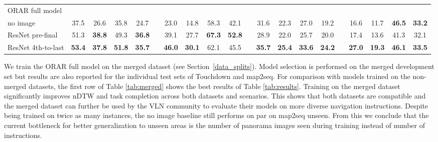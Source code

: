 \documentclass[11pt]{article}
\begin{document}
\begin{table*}[ht]
{\begin{tabular}{@{}lc@{}cc@{}clc@{}cc@{}clc@{}cc@{}clc@{}cc@{}c@{}}
\midrule
ORAR full model\\
 no image          & 37.5 & 26.6 & 35.8 & 24.7 && 23.0 & 14.8 & 58.3 & 42.1 && 31.6 & 22.3 & 27.0 & 19.2 && 16.6 & 11.7 & \textbf{46.5} & \textbf{33.2} \\
 ResNet pre-final  & 51.3 & \textbf{38.8} & 49.3 & \textbf{36.8} && 39.1 & 27.7 & \textbf{67.3} & \textbf{52.8} && 28.9 & 22.0 & 25.7 & 20.0 && 17.4 & 13.6 & 41.3 & 32.1 \\
 ResNet 4th-to-last  & \textbf{53.4} & \textbf{37.8} & \textbf{51.8} & \textbf{35.7} && \textbf{46.0} & \textbf{30.1} & 62.1 & 45.5 && \textbf{35.7} & \textbf{25.4} & \textbf{33.6} & \textbf{24.2} && \textbf{27.0} & \textbf{19.3} & \textbf{46.1} & \textbf{33.5} \\
\bottomrule
\end{tabular}
}
\caption{Results for models trained on the merged dataset. Test results are presented for the merged test set and individual Touchdown and map2seq test sets. Metrics are normalized Dynamic Time Warping~(nDTW) and task completion~(TC). In the first row the best results of Table \ref{tab:results} (non-merged training sets) are listed for comparison. The bottom section presents results on the \textit{ORAR full model} with different types of image features.}
\label{tab:merged}
\end{table*}



 We train the ORAR full model on the merged dataset (see Section~\ref{data_splits}). Model selection is performed on the merged development set but results are also reported for the individual test sets of Touchdown and map2seq. For comparison with models trained on the non-merged datasets, the first row of Table \ref{tab:merged} shows the best results of Table \ref{tab:results}. Training on the merged dataset significantly improves nDTW and task completion across both datasets and scenarios. This shows that both datasets are compatible and the merged dataset can further be used by the VLN community to evaluate their models on more diverse navigation instructions. Despite being trained on twice as many instances, the no image baseline still performs on par on map2seq unseen. From this we conclude that the current bottleneck for better generalization to unseen areas is the number of panorama images seen during training instead of number of instructions.
\end{document}
